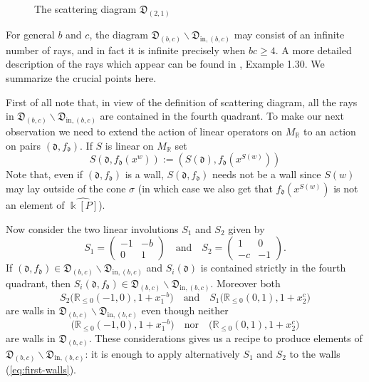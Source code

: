 \documentclass[10pt]{amsart}
\theoremstyle{remark}
\numberwithin{equation}{section}
\newcommand{\RR}{\mathbb{R}}
\newcommand{\fd}{\mathfrak{d}}
\newcommand{\fD}{\mathfrak{D}}
\begin{document}
\begin{figure}
  \centering
  \caption{The scattering diagram $\fD_{(2,1)}$} 
  \label{fig:diagex}
\end{figure}

For general $b$ and $c$, the diagram $\fD_{(b,c)} \backslash
\fD_{\mathrm{in},(b,c)}$ may consist of an infinite number of rays, and in fact
it is infinite precisely when $bc\ge 4$. A more detailed description of the rays
which appear can be found in \cite{GHKK}, Example 1.30. We summarize the crucial
points here.

First of all note that, in view of the definition of scattering diagram, all the
rays in  $\fD_{(b,c)} \backslash \fD_{\mathrm{in},(b,c)}$ are contained in the
fourth quadrant.  To make our next observation we need to extend the action of
linear operators on $M_\RR$ to an action on pairs $(\fd,f_\fd)$. If $S$ is
linear on $M_\RR$ set
\begin{equation}
  \label{eqn:linear action}
  S(\fd,f_\fd(x^w))
  :=
  \left( S(\fd), f_\fd\left(x^{S(w)}\right) \right)
\end{equation}
Note that, even if $(\fd,f_\fd)$ is a wall, $S(\fd,f_\fd)$ needs not be a wall
since $S(w)$ may lay outside of the cone $\sigma$ (in which case we also get
that  $f_\fd\left(x^{S(w)}\right)$ is not an element of $\widehat{\Bbbk [P]}$).

Now consider the two linear involutions $S_1$ and $S_2$ given by
\[
  S_1 =  
  \begin{pmatrix}
    -1 & -b \\
    0& 1
  \end{pmatrix}
  \quad
  \mbox{and}
  \quad
  S_2 =  
  \begin{pmatrix}
    1 & 0 \\
    -c & -1
  \end{pmatrix}.
\]
If $(\fd, f_{\fd}) \in \fD_{(b,c)} \backslash \fD_{\mathrm{in},(b,c)}$ and $S_i
(\fd)$ is contained strictly in the fourth quadrant, then $S_i(\fd, f_{\fd}) \in
\fD_{(b,c)} \backslash \fD_{\mathrm{in},(b,c)}$. Moreover both 
\begin{equation}
  \label{eq:first-walls}
  S_2\big(\RR_{\leq 0}(-1,0),1+x_1^{-b}\big)
  \quad
  \mbox{and}
  \quad
  S_1\big(\RR_{\leq 0}(0,1),1+x_2^c\big)
\end{equation}
are walls in $\fD_{(b,c)} \backslash \fD_{\mathrm{in},(b,c)}$ even though
neither 
\[
  \big(\RR_{\leq 0}(-1,0),1+x_1^{-b}\big)
  \quad
  \mbox{nor}
  \quad
  \big(\RR_{\leq 0}(0,1),1+x_2^c\big)
\]
are walls in $\fD_{(b,c)}$. These considerations gives us a recipe to produce
elements of $\fD_{(b,c)} \backslash \fD_{\mathrm{in},(b,c)}$: it is enough to apply
alternatively $S_1$ and $S_2$ to the walls (\ref{eq:first-walls}).
\end{document}

